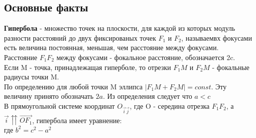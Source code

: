 \documentclass{book}
\begin{document}
\subsection{Основные факты}
\textbf{Гипербола} - множество точек на плоскости, для каждой из которых модуль разности расстояний до двух фиксированых точек $F_1$ и $F_2$, называемвх фокусами есть величина постоянная, меньшая, чем расстояние между фокусами.\\
Расстояние $F_1F_2$ между фокусами - фокальное расстояние, обозначается 2c.\\
Если M - точка, принадлежащая гиперболе, то отрезки $F_1M$ и $F_2M$ - фокальные радиусы точки M.\\
По определению для любой точки M эллипса $|F_1M+F_2M|=\textit{const}$. Эту величину принято обозначать $2a$. Из определения следует что $a<c$\\
В прямоугольной системе координат $O_{\overrightarrow{i}\overrightarrow{j}}$,  где O - середина отрезка $F_1F_2$, а $\overrightarrow{i}\upuparrows\overrightarrow{OF_1}$, гипербола имеет уравнение:\\
где $b^2=c^2-a^2$\\
\end{document}
